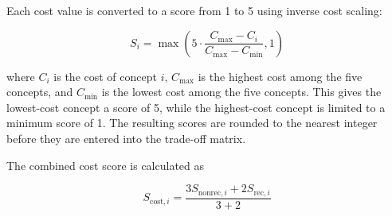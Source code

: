 Each cost value is converted to a score from 1 to 5 using inverse cost
scaling:

\begin{equation}
S_i =
\max \left(
5 \cdot
\frac{C_{\max} - C_i}{C_{\max} - C_{\min}},
1
\right)
\end{equation}

where \(C_i\) is the cost of concept \(i\), \(C_{\max}\) is the highest
cost among the five concepts, and \(C_{\min}\) is the lowest cost among
the five concepts. This gives the lowest-cost concept a score of 5,
while the highest-cost concept is limited to a minimum score of 1. The
resulting scores are rounded to the nearest integer before they are
entered into the trade-off matrix.

The combined cost score is calculated as

\begin{equation}
S_{\mathrm{cost},i}
=
\frac{
3S_{\mathrm{nonrec},i}
+
2S_{\mathrm{rec},i}
}{3+2}
\end{equation}

